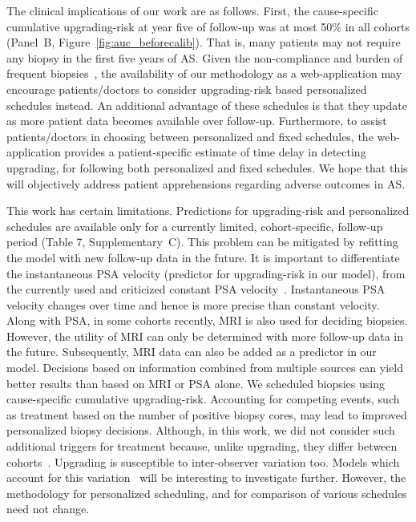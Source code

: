 The clinical implications of our work are as follows. First, the cause-specific cumulative upgrading-risk at year five of follow-up was at most 50\% in all cohorts (Panel~B, Figure~\ref{fig:auc_beforecalib}). That is, many patients may not require any biopsy in the first five years of AS. Given the non-compliance and burden of frequent biopsies~\citep{bokhorst2015compliance}, the availability of our methodology as a web-application may encourage patients/doctors to consider upgrading-risk based personalized schedules instead. An additional advantage of these schedules is that they update as more patient data becomes available over follow-up. Furthermore, to assist patients/doctors in choosing between personalized and fixed schedules, the web-application provides a patient-specific estimate of time delay in detecting upgrading, for following both personalized and fixed schedules. We hope that this will objectively address patient apprehensions regarding adverse outcomes in AS. 

This work has certain limitations. Predictions for upgrading-risk and personalized schedules are available only for a currently limited, cohort-specific, follow-up period (Table 7, Supplementary~C). This problem can be mitigated by refitting the model with new follow-up data in the future. It is important to differentiate the instantaneous PSA velocity (predictor for upgrading-risk in our model), from the currently used and criticized constant PSA velocity~\citep{vickers2009psavelocity}. Instantaneous PSA velocity changes over time and hence is more precise than constant velocity. Along with PSA, in some cohorts recently, MRI is also used for deciding biopsies. However, the utility of MRI can only be determined with more follow-up data in the future. Subsequently, MRI data can also be added as a predictor in our model. Decisions based on information combined from multiple sources can yield better results than based on MRI or PSA alone. We scheduled biopsies using cause-specific cumulative upgrading-risk. Accounting for competing events, such as treatment based on the number of positive biopsy cores, may lead to improved personalized biopsy decisions. Although, in this work, we did not consider such additional triggers for treatment because, unlike upgrading, they differ between cohorts~\citep{nieboer2018active}. Upgrading is susceptible to inter-observer variation too. Models which account for this variation~\citep{coley2017prediction,balasubramanian2003estimation} will be interesting to investigate further. However, the methodology for personalized scheduling, and for comparison of various schedules need not change.